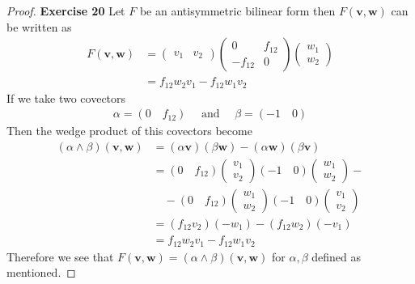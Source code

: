 \documentclass[11pt]{article}
\theoremstyle{definition}
\begin{document}
\begin{proof}{\textbf{Exercise 20}}
    Let $F$ be an antisymmetric bilinear form then $F(\bm{v}, \bm{w})$ can
    be written as
    \begin{align*}
        F(\bm{v}, \bm{w}) &= \begin{pmatrix} v_1 & v_2 \end{pmatrix}
        \begin{pmatrix}
            0 & f_{12}\\ -f_{12} & 0
        \end{pmatrix}
        \begin{pmatrix} w_1 \\ w_2 \end{pmatrix}\\
        &= f_{12}w_2v_1 - f_{12}w_1v_2
    \end{align*}
    If we take two covectors
    \begin{align*}
        \alpha = (0\quad f_{12}) \quad \text{ and } \quad \beta = (-1\quad 0)
    \end{align*}
    Then the wedge product of this covectors become
    \begin{align*}
        (\alpha \wedge\beta)(\bm{v}, \bm{w})
        &= (\alpha\bm{v})(\beta\bm{w}) - (\alpha\bm{w})(\beta\bm{v})\\
        &= (0\quad f_{12})\begin{pmatrix} v_1 \\ v_2 \end{pmatrix}
        (-1\quad 0)\begin{pmatrix} w_1 \\ w_2 \end{pmatrix} -\\
        &\quad - (0\quad f_{12})\begin{pmatrix} w_1 \\ w_2 \end{pmatrix}
        (-1\quad 0)\begin{pmatrix} v_1 \\ v_2 \end{pmatrix}\\
        &= (f_{12}v_2)(-w_1) - (f_{12}w_2)(-v_1)\\
        &= f_{12}w_2v_1 - f_{12}w_1v_2
    \end{align*}
    Therefore we see that $F(\bm{v}, \bm{w}) = (\alpha \wedge\beta)(\bm{v}, \bm{w})$
    for $\alpha, \beta$ defined as mentioned.
\end{proof}
\cleardoublepage
\end{document}
